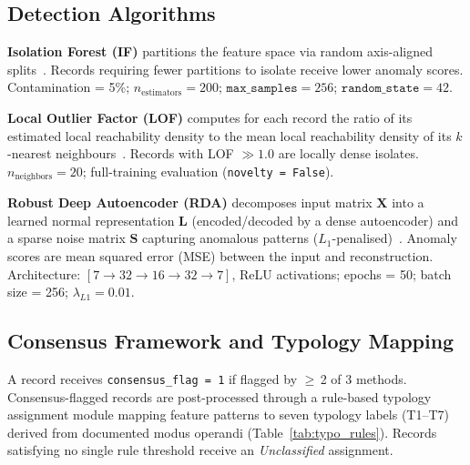 \documentclass[3p,times,procedia]{elsarticle}
\begin{document}
\subsection{Detection Algorithms}

\textbf{Isolation Forest (IF)} partitions the feature space via random axis-aligned splits~\cite{ref19,ref20}. Records requiring fewer partitions to isolate receive lower anomaly scores. Contamination = 5\%; $n_{\text{estimators}} = 200$; $\texttt{max\_samples} = 256$; $\texttt{random\_state} = 42$.

\textbf{Local Outlier Factor (LOF)} computes for each record the ratio of its estimated local reachability density to the mean local reachability density of its $k$-nearest neighbours~\cite{ref25}. Records with LOF $\gg 1.0$ are locally dense isolates. $n_{\text{neighbors}} = 20$; full-training evaluation (\texttt{novelty = False}).

\textbf{Robust Deep Autoencoder (RDA)} decomposes input matrix $\mathbf{X}$ into a learned normal representation $\mathbf{L}$ (encoded/decoded by a dense autoencoder) and a sparse noise matrix $\mathbf{S}$ capturing anomalous patterns ($L_1$-penalised)~\cite{ref34}. Anomaly scores are mean squared error (MSE) between the input and reconstruction. Architecture: $[7 \to 32 \to 16 \to 32 \to 7]$, ReLU activations; epochs = 50; batch size = 256; $\lambda_{L1} = 0.01$.

\subsection{Consensus Framework and Typology Mapping}

A record receives \texttt{consensus\_flag = 1} if flagged by $\geq$\,2 of 3 methods. Consensus-flagged records are post-processed through a rule-based typology assignment module mapping feature patterns to seven typology labels (T1--T7) derived from documented modus operandi (Table~\ref{tab:typo_rules}). Records satisfying no single rule threshold receive an \textit{Unclassified} assignment.
\end{document}

